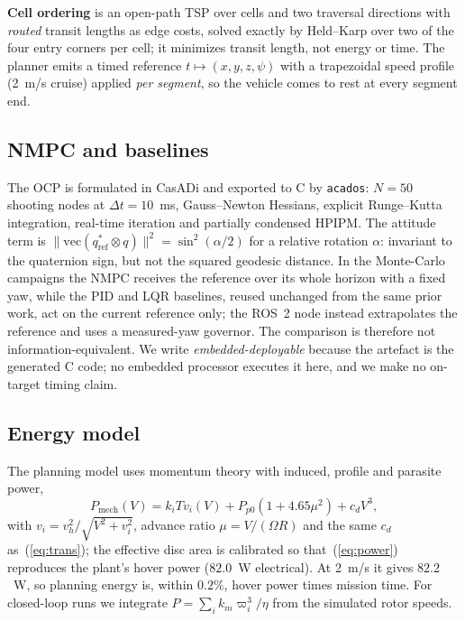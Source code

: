 \documentclass[\PAPERCLASSOPT]{IEEEtran}
\newcommand{\code}[1]{\texttt{\small #1}}
\begin{document}
\textbf{Cell ordering} is an open-path TSP over cells and two traversal
directions with \emph{routed} transit lengths as edge costs, solved exactly by
Held--Karp over two of the four entry corners per cell; it minimizes transit
length, not energy or time. The planner emits a timed
reference $t\mapsto(x,y,z,\psi)$ with a trapezoidal speed profile (2~m/s cruise)
applied \emph{per segment}, so the vehicle comes to rest at every segment end.

\subsection{NMPC and baselines}

The OCP is formulated in CasADi and exported to C by \code{acados}: $N=50$
shooting nodes at $\Delta t=10$~ms, Gauss--Newton Hessians, explicit Runge--Kutta
integration, real-time iteration and partially condensed HPIPM. The attitude
term is $\lVert \mathrm{vec}(q_\mathrm{ref}^{*}\otimes q)\rVert^2=\sin^2(\alpha/2)$
for a relative rotation $\alpha$: invariant to the quaternion sign, but not the
squared geodesic distance. In the Monte-Carlo campaigns the NMPC receives the
reference over its whole horizon with a fixed yaw, while the PID and LQR
baselines, reused unchanged from the same prior work, act on the current
reference only; the
ROS~2 node instead extrapolates the reference and uses a measured-yaw governor.
The comparison is therefore not information-equivalent. We write
\emph{embedded-deployable} because the artefact is the generated C code; no
embedded processor executes it here, and we make no on-target timing claim.

\subsection{Energy model}

The planning model uses momentum theory with induced, profile and parasite
power,
\begin{equation}
  P_\mathrm{mech}(V) = k_i T v_i(V) + P_{p0}\!\left(1 + 4.65\mu^2\right)
                       + c_d V^3 ,
  \label{eq:power}
\end{equation}
with $v_i = v_h^2/\sqrt{V^2+v_i^2}$, advance ratio $\mu=V/(\Omega R)$ and the
same $c_d$ as~(\ref{eq:trans}); the effective disc area is calibrated so
that~(\ref{eq:power}) reproduces the plant's hover power ($82.0$~W electrical).
At 2~m/s it gives $82.2$~W, so planning energy is, within $0.2\%$, hover power
times mission time. For closed-loop runs we integrate
$P=\sum_i k_m\varpi_i^3/\eta$ from the simulated rotor speeds.
\end{document}
